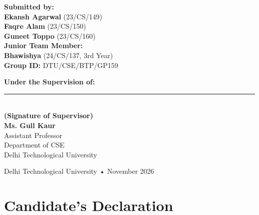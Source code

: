 \documentclass[12pt,a4paper,oneside]{report}
\begin{document}
\begin{titlepage}
\begin{singlespace}
\begin{center}
        \begin{minipage}[t]{0.48\textwidth}
            \begin{flushleft} \normalsize
                \textbf{Submitted by:}\\[0.15cm]
                \textbf{Ekansh Agarwal} (23/CS/149)\\
                \textbf{Faqre Alam} (23/CS/150)\\
                \textbf{Guneet Toppo} (23/CS/160)\\[0.2cm]
                \textbf{Junior Team Member:}\\
                \textbf{Bhawishya} (24/CS/137, 3rd Year)\\[0.2cm]
                \textbf{Group ID:} DTU/CSE/BTP/GP159
            \end{flushleft}
        \end{minipage}
        \hfill
        \begin{minipage}[t]{0.48\textwidth}
            \begin{flushright} \normalsize
                \textbf{Under the Supervision of:}\\[0.8cm]
                \rule{5.2cm}{0.4pt}\\[0.12cm]
                \textbf{(Signature of Supervisor)}\\[0.18cm]
                \textbf{Ms. Gull Kaur}\\
                Assistant Professor\\
                Department of CSE\\
                Delhi Technological University
            \end{flushright}
        \end{minipage}

        \vfill
        {\normalsize Delhi Technological University • November 2026}
    \end{center}
    \end{singlespace}
    \end{titlepage}

    \chapter*{Candidate's Declaration}
\end{document}
